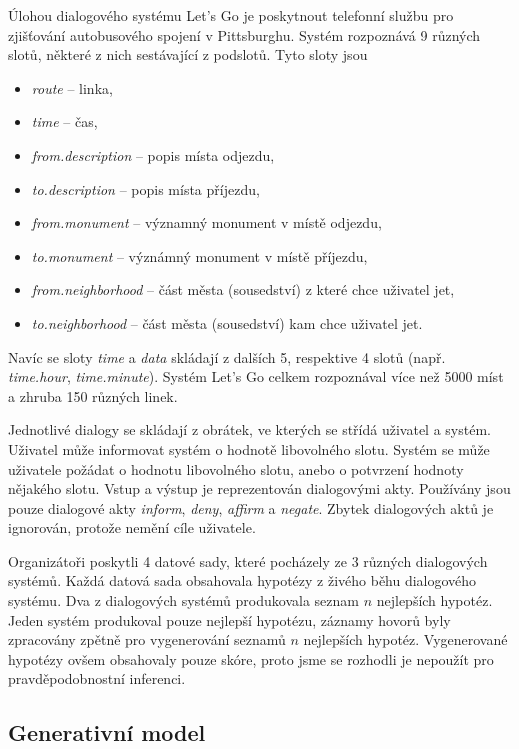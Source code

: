 Úlohou dialogového systému Let's Go je poskytnout telefonní službu pro zjišťování autobusového spojení v Pittsburghu.
Systém rozpoznává 9 různých slotů, některé z nich sestávající z podslotů.
Tyto sloty jsou
\begin{itemize}
\item \emph{route} -- linka,
\item \emph{time} -- čas,
\item \emph{from.description} -- popis místa odjezdu,
\item \emph{to.description} -- popis místa příjezdu,
\item \emph{from.monument} -- významný monument v místě odjezdu,
\item \emph{to.monument} -- význámný monument v místě příjezdu,
\item \emph{from.neighborhood} -- část města (sousedství) z které chce uživatel jet,
\item \emph{to.neighborhood} -- část města (sousedství) kam chce uživatel jet.
\end{itemize}
Navíc se sloty \emph{time} a \emph{data} skládají z dalších 5, respektive 4 slotů (např. \emph{time.hour}, \emph{time.minute}).
Systém Let's Go celkem rozpoznával více než 5000 míst a zhruba 150 různých linek.

Jednotlivé dialogy se skládají z obrátek, ve kterých se střídá uživatel a systém.
Uživatel může informovat systém o hodnotě libovolného slotu.
Systém se může uživatele požádat o hodnotu libovolného slotu, anebo o potvrzení hodnoty nějakého slotu.
Vstup a výstup je reprezentován dialogovými akty.
Používány jsou pouze dialogové akty \emph{inform}, \emph{deny}, \emph{affirm} a \emph{negate}.
Zbytek dialogových aktů je ignorován, protože nemění cíle uživatele.

Organizátoři poskytli 4 datové sady, které pocházely ze 3 různých dialogových systémů.
Každá datová sada obsahovala hypotézy z živého běhu dialogového systému.
Dva z dialogových systémů produkovala seznam $n$ nejlepších hypotéz.
Jeden systém produkoval pouze nejlepší hypotézu, záznamy hovorů byly zpracovány zpětně pro vygenerování seznamů $n$ nejlepších hypotéz.
Vygenerované hypotézy ovšem obsahovaly pouze skóre, proto jsme se rozhodli je nepoužít pro pravděpodobnostní inferenci.

\subsection{Generativní model}

